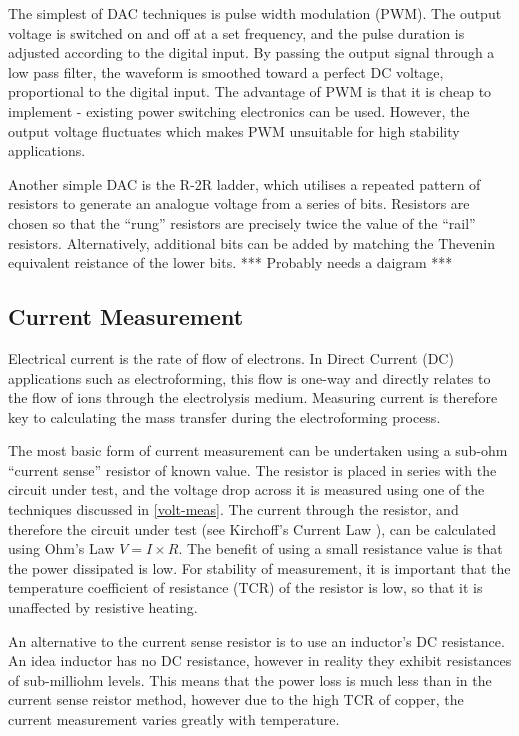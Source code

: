 The simplest of DAC techniques is pulse width modulation (PWM). The output voltage is switched on and off at a set frequency, and the pulse duration is adjusted according to the digital input. By passing the output signal through a low pass filter, the waveform is smoothed toward a perfect DC voltage, proportional to the digital input. The advantage of PWM is that it is cheap to implement - existing power switching electronics can be used. However, the output voltage fluctuates which makes PWM unsuitable for high stability applications.

Another simple DAC is the R-2R ladder, which utilises a repeated pattern of resistors to generate an analogue voltage from a series of bits. Resistors are chosen so that the ``rung'' resistors are precisely twice the value of the ``rail'' resistors. Alternatively, additional bits can be added by matching the Thevenin equivalent reistance of the lower bits. *** Probably needs a daigram ***


\subsection{Current Measurement}
Electrical current is the rate of flow of electrons. In Direct Current (DC) applications such as electroforming, this flow is one-way and directly relates to the flow of ions through the electrolysis medium. Measuring current is therefore key to calculating the mass transfer during the electroforming process.

The most basic form of current measurement can be undertaken using a sub-ohm ``current sense'' resistor of known value. The resistor is placed in series with the circuit under test, and the voltage drop across it is measured using one of the techniques discussed in \ref{volt-meas}. The current through the resistor, and therefore the circuit under test (see Kirchoff's Current Law \cite{kirchoff}), can be calculated using Ohm's Law \cite{ohm} $V = I \times R$. The benefit of using a small resistance value is that the power dissipated is low. For stability of measurement, it is important that the temperature coefficient of resistance (TCR) of the resistor is low, so that it is unaffected by resistive heating. 

An alternative to the current sense resistor is to use an inductor's DC resistance. An idea inductor has no DC resistance, however in reality they exhibit resistances of sub-milliohm levels. This means that the power loss is much less than in the current sense reistor method, however due to the high TCR of copper, the current measurement varies greatly with temperature.

